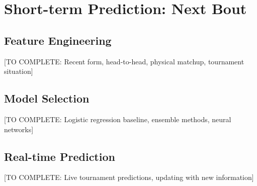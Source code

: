 \section{Short-term Prediction: Next Bout}

\subsection{Feature Engineering}

[TO COMPLETE: Recent form, head-to-head, physical matchup, tournament situation]

\subsection{Model Selection}

[TO COMPLETE: Logistic regression baseline, ensemble methods, neural networks]

\subsection{Real-time Prediction}

[TO COMPLETE: Live tournament predictions, updating with new information]